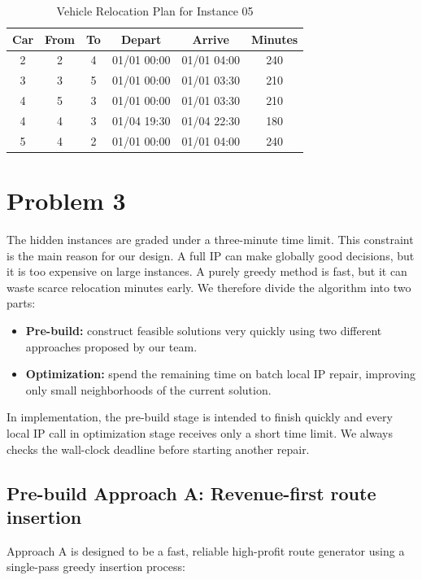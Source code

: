 \documentclass[10pt,a4paper]{article}
\begin{document}
\begin{table}[htbp]
\centering
\caption{Vehicle Relocation Plan for Instance 05} \label{tab:reloc_plan} 
\begin{tabular}{cccccc}
\toprule
Car & From & To & Depart & Arrive & Minutes \\
\midrule
2 & 2 & 4 & 01/01 00:00 & 01/01 04:00 & 240 \\
3 & 3 & 5 & 01/01 00:00 & 01/01 03:30 & 210 \\
4 & 5 & 3 & 01/01 00:00 & 01/01 03:30 & 210 \\
4 & 4 & 3 & 01/04 19:30 & 01/04 22:30 & 180 \\
5 & 4 & 2 & 01/01 00:00 & 01/01 04:00 & 240 \\
\bottomrule
\end{tabular}
\end{table}

\section*{Problem 3}

The hidden instances are graded under a three-minute time limit.  This constraint
is the main reason for our design.  A full IP can make globally good decisions,
but it is too expensive on large instances.  A purely greedy method is fast, but
it can waste scarce relocation minutes early.  We therefore divide the algorithm into two parts:

\begin{itemize}[itemsep=2pt, parsep=0pt, topsep=4pt]
    \item \textbf{Pre-build:} construct feasible solutions very quickly
    using two different approaches proposed by our team.
    \item \textbf{Optimization:} spend the remaining time on batch local IP
    repair, improving only small neighborhoods of the current solution.
\end{itemize}
In implementation, the pre-build stage is intended to finish quickly and every
local IP call in optimization stage receives only a short time limit.  We always checks the wall-clock deadline before starting another repair.

\subsection*{Pre-build Approach A: Revenue-first route insertion}

Approach A is designed to be a fast, reliable high-profit route generator using a single-pass greedy insertion process:
\end{document}
